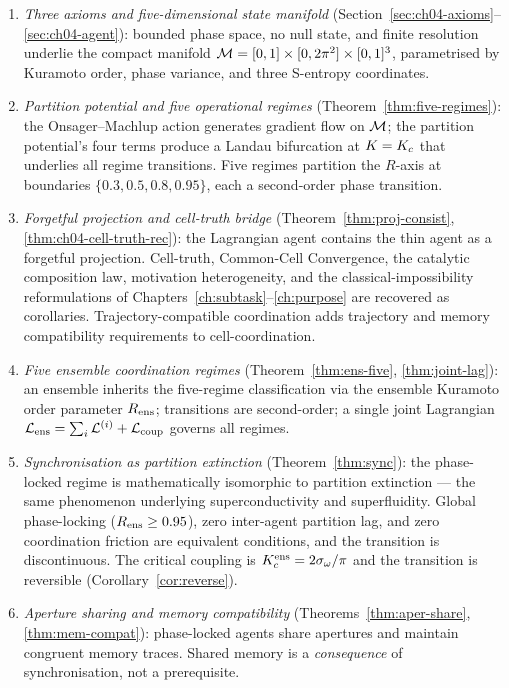 \begin{enumerate}[label=(\arabic*),leftmargin=*]
\item \emph{Three axioms and five-dimensional state manifold}
(Section~\ref{sec:ch04-axioms}--\ref{sec:ch04-agent}): bounded phase space,
no null state, and finite resolution underlie the compact manifold
$\mathcal{M}=[0,1]\times[0,2\pi^2]\times[0,1]^3$, parametrised by Kuramoto order,
phase variance, and three S-entropy coordinates.
\item \emph{Partition potential and five operational regimes}
(Theorem~\ref{thm:five-regimes}): the Onsager--Machlup action generates
gradient flow on $\mathcal{M}$; the partition potential's four terms produce a
Landau bifurcation at $K=K_c$ that underlies all regime transitions. Five
regimes partition the $R$-axis at boundaries $\{0.3,0.5,0.8,0.95\}$, each a
second-order phase transition.
\item \emph{Forgetful projection and cell-truth bridge}
(Theorem~\ref{thm:proj-consist}, \ref{thm:ch04-cell-truth-rec}): the
Lagrangian agent contains the thin agent as a forgetful projection. Cell-truth,
Common-Cell Convergence, the catalytic composition law, motivation
heterogeneity, and the classical-impossibility reformulations of
Chapters~\ref{ch:subtask}--\ref{ch:purpose} are recovered as corollaries.
Trajectory-compatible coordination adds trajectory and memory compatibility
requirements to cell-coordination.
\item \emph{Five ensemble coordination regimes} (Theorem~\ref{thm:ens-five},
\ref{thm:joint-lag}): an ensemble inherits the five-regime classification
via the ensemble Kuramoto order parameter $R_{\mathrm{ens}}$; transitions are second-order;
a single joint Lagrangian $\mathcal{L}_{\mathrm{ens}}=\sum_i\mathcal{L}^{(i)}+\mathcal{L}_{\mathrm{coup}}$
governs all regimes.
\item \emph{Synchronisation as partition extinction} (Theorem~\ref{thm:sync}):
the phase-locked regime is mathematically isomorphic to partition extinction
--- the same phenomenon underlying superconductivity and superfluidity. Global
phase-locking ($R_{\mathrm{ens}}\ge 0.95$), zero inter-agent partition lag, and zero
coordination friction are equivalent conditions, and the transition is
discontinuous. The critical coupling is $K_c^{\mathrm{ens}}=2\sigma_\omega/\pi$
and the transition is reversible (Corollary~\ref{cor:reverse}).
\item \emph{Aperture sharing and memory compatibility}
(Theorems~\ref{thm:aper-share}, \ref{thm:mem-compat}): phase-locked agents
share apertures and maintain congruent memory traces. Shared memory is a
\emph{consequence} of synchronisation, not a prerequisite.
\end{enumerate}

